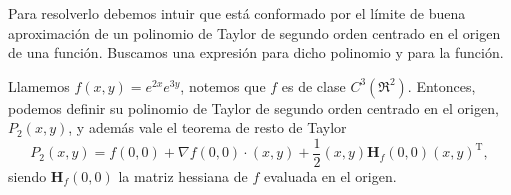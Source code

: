 
\begin{solution}
    Para resolverlo debemos intuir que está conformado por el límite de buena aproximación de un polinomio de Taylor de segundo orden centrado en el origen de una función. Buscamos una expresión para dicho polinomio y para la función.

    Llamemos $f(x,y) = e^{2x}e^{3y}$, notemos que $f$ es de clase $C^3(\Re^{2}).$  Entonces, podemos definir su polinomio de Taylor de segundo orden centrado en el origen, $ P_2(x,y)$, y adem\'as vale el teorema de resto de Taylor
    \[
        P_2(x,y) = f(0,0) + \nabla f(0,0)\cdot(x,y) + \frac{1}{2}(x,y)\boldsymbol{H}_f(0,0)(x,y)^\mathrm{T},
    \]
    siendo $\boldsymbol{H}_f(0,0)$ la matriz hessiana de $f$ evaluada en el origen.


\end{solution}
